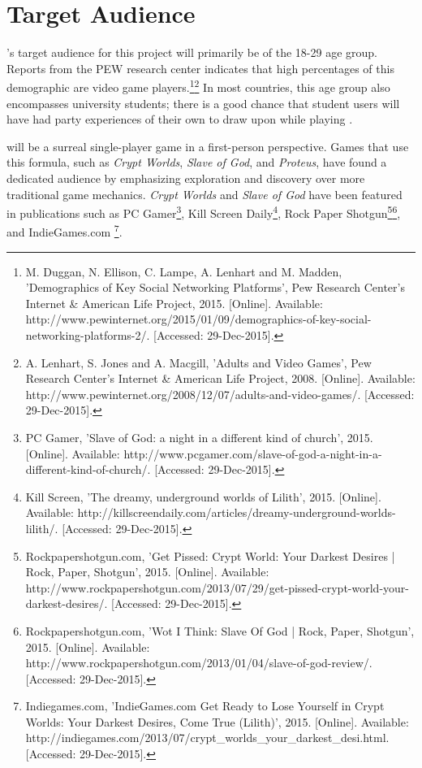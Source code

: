 \section{Target Audience}
\ourteam{}'s target audience for this project will primarily be of the 18-29 age group. Reports from the PEW research center indicates that high percentages of this demographic are video game players.\footnote{M. Duggan, N. Ellison, C. Lampe, A. Lenhart and M. Madden, 'Demographics of Key Social Networking Platforms', Pew Research Center's Internet \& American Life Project, 2015. [Online]. Available: http://www.pewinternet.org/2015/01/09/demographics-of-key-social-networking-platforms-2/. [Accessed: 29-Dec-2015].}\footnote{A. Lenhart, S. Jones and A. Macgill, 'Adults and Video Games', Pew Research Center's Internet \& American Life Project, 2008. [Online]. Available: http://www.pewinternet.org/2008/12/07/adults-and-video-games/. [Accessed: 29-Dec-2015].
} In most countries, this age group also encompasses university students; there is a good chance that student users will have had party experiences of their own to draw upon while playing \ourgame{}.

\ourgame{} will be a surreal single-player game in a first-person perspective. Games that use this formula, such as \textit{Crypt Worlds}, \textit{Slave of God}, and \textit{Proteus}, have found a dedicated audience by emphasizing exploration and discovery over more traditional game mechanics. \textit{Crypt Worlds} and \textit{Slave of God} have been featured in publications such as PC Gamer\footnote{PC Gamer, 'Slave of God: a night in a different kind of church', 2015. [Online]. Available: http://www.pcgamer.com/slave-of-god-a-night-in-a-different-kind-of-church/. [Accessed: 29-Dec-2015].}, Kill Screen Daily\footnote{Kill Screen, 'The dreamy, underground worlds of Lilith', 2015. [Online]. Available: http://killscreendaily.com/articles/dreamy-underground-worlds-lilith/. [Accessed: 29-Dec-2015].}, Rock Paper Shotgun\footnote{Rockpapershotgun.com, 'Get Pissed: Crypt World: Your Darkest Desires | Rock, Paper, Shotgun', 2015. [Online]. Available: http://www.rockpapershotgun.com/2013/07/29/get-pissed-crypt-world-your-darkest-desires/. [Accessed: 29-Dec-2015].}\footnote{Rockpapershotgun.com, 'Wot I Think: Slave Of God | Rock, Paper, Shotgun', 2015. [Online]. Available: http://www.rockpapershotgun.com/2013/01/04/slave-of-god-review/. [Accessed: 29-Dec-2015].}, and IndieGames.com \footnote{Indiegames.com, 'IndieGames.com Get Ready to Lose Yourself in Crypt Worlds: Your Darkest Desires, Come True (Lilith)', 2015. [Online]. Available: http://indiegames.com/2013/07/crypt\_worlds\_your\_darkest\_desi.html. [Accessed: 29-Dec-2015].}.


